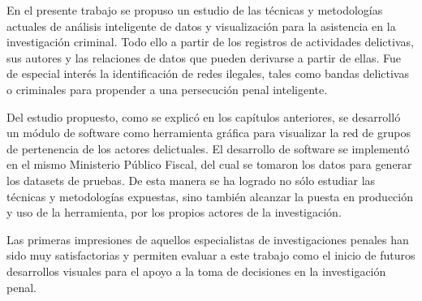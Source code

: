 En el presente trabajo se propuso un estudio de las técnicas y metodologías actuales de análisis inteligente de datos y visualización para la asistencia en la investigación criminal. Todo ello a partir de los registros de actividades delictivas, sus autores y las relaciones de datos que pueden derivarse a partir de ellas. Fue de especial interés la identificación de redes ilegales, tales como bandas delictivas o criminales para propender a una persecución penal inteligente.

Del estudio propuesto, como se explicó en los capítulos anteriores, se desarrolló un módulo de software como herramienta gráfica para visualizar la red de grupos de pertenencia de los actores delictuales.
El desarrollo de software se implementó en el mismo Ministerio Público Fiscal, del cual se tomaron los datos para generar los datasets de pruebas. De esta manera se ha logrado no sólo estudiar las técnicas y metodologías expuestas, sino también alcanzar la puesta en producción y uso de la herramienta, por los propios actores de la investigación.

Las primeras impresiones de aquellos especialistas de investigaciones penales han sido muy satisfactorias y permiten evaluar a este trabajo como el inicio de futuros desarrollos visuales para el apoyo a la toma de decisiones en la investigación penal.
